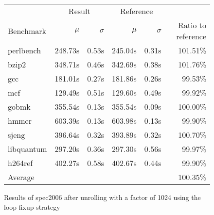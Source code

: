 \begin{figure}[h]
    \begin{center}
        \begin{tabular}{lrrrrr}
            \toprule
            & \multicolumn{2}{c}{Result} & \multicolumn{2}{c}{Reference}\\
            Benchmark & $\mu$ & $\sigma$ & $\mu$ & $\sigma$ & Ratio to reference\\
            \midrule
            perlbench & 248.73s & 0.53s & 245.04s & 0.31s & 101.51\%\\
            bzip2 & 348.71s & 0.46s & 342.69s & 0.38s & 101.76\%\\
            gcc & 181.01s & 0.27s & 181.86s & 0.26s & 99.53\%\\
            mcf & 129.49s & 0.51s & 129.60s & 0.49s & 99.92\%\\
            gobmk & 355.54s & 0.13s & 355.54s & 0.09s & 100.00\%\\
            hmmer & 603.39s & 0.13s & 603.98s & 0.13s & 99.90\%\\
            sjeng & 396.64s & 0.32s & 393.89s & 0.32s & 100.70\%\\
            libquantum & 297.20s & 0.36s & 297.30s & 0.56s & 99.97\%\\
            h264ref & 402.27s & 0.58s & 402.67s & 0.44s & 99.90\%\\
            \midrule
            Average & & & & & 100.35\%\\
            \bottomrule
        \end{tabular}
    \end{center}
    \caption{Results of spec2006 after unrolling with a factor of 1024 using the loop fixup strategy}
    \label{fig:eval:perf:loop:1024}
\end{figure}